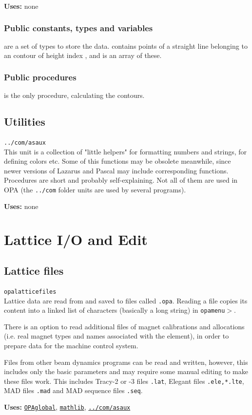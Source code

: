 \documentclass[12pt]{article}
\newcommand\code[1]{{\tt #1}}
\newcommand\guico[1]{{\color{blue}\code{#1}}}
\newcommand{\unico}[1]{{\color{burntorange}\code{#1}}}
\newcommand{\grcod}[2]{\opagui{#1}$>$\guico{#2}}
\newcommand{\opagui}[1]{\colorbox{blue!20}{\code{#1}}}
\newcommand{\opauni}[1]{\colorbox{orange!30}{\code{#1}}}
\newcommand{\ounih}[2]{\subsection{\label{#2}#1}{\Huge\opauni{#2}}\\}
\newcommand{\ouni}[1]{\hyperref[#1]{\opauni{#1}}}
\newcommand{\uses}[1]{{\bf Uses: } #1}
\newcommand{\desc}[1]{#1}
\newcommand{\pvar}[1]{\subsubsection*{Public constants, types and variables} #1}
\newcommand{\ppro}[1]{\subsubsection*{Public procedures} #1}
\begin{document}
\uses{none}
\pvar{
\unico{Con...} are a set of types to store the data. \unico{ConLinesType} contains points of a straight line belonging to an contour of height index \unico{ih}, and \unico{ConLinesArray} is an array of these.
}
\ppro{
\unico{Conrec} is the only procedure, calculating the contours.}

\ounih{Utilities}{../com/asaux}

\desc{This unit is a collection of "little helpers" for formatting numbers and strings, for defining colors etc. Some of this functions may be obsolete meanwhile, since newer versions of Lazarus and Pascal may include corresponding functions.
Procedures are short and probably self-explaining. Not all of them are used in OPA (the \code{../com} folder units are used by several programs).}

\uses{none}

\section{\label{secedit}Lattice I/O and Edit} 

\ounih{Lattice files}{opalatticefiles}

\desc{Lattice data are read from and saved to files called \code{*.opa}. Reading a file copies its content into a linked list of characters (basically a long string) in \grcod{opamenu}{ReadFile}.

There is an option to read additional files of magnet calibrations and allocations (i.e. real magnet types and names associated with the element), in order to prepare data for the machine control system.

Files from other beam dynamics programs can be read and written, however, this includes only the basic parameters and may require some manual editing to make these files work. This includes Tracy-2 or -3 files \code{*.lat}, Elegant files \code{*.ele,*.lte}, MAD files \code{*.mad} and MAD sequence files \code{*.seq}.
}

\uses{\ouni{OPAglobal}, \ouni{mathlib}, \ouni{../com/asaux}}
\end{document}
